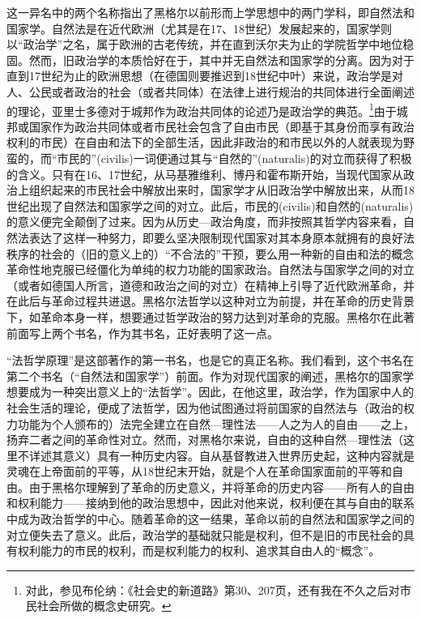 这一异名中的两个名称指出了黑格尔以前形而上学思想中的两门学科，即自然法和国家学。自然法是在近代欧洲（尤其是在17、18世纪）发展起来的，国家学则以“政治学”之名，属于欧洲的古老传统，并在直到沃尔夫为止的学院哲学中地位稳固。然而，旧政治学的本质恰好在于，其中并无自然法和国家学的分离。因为对于直到17世纪为止的欧洲思想（在德国则要推迟到18世纪中叶）来说，政治学是对人、公民或者政治的社会（或者共同体）在法律上进行规治的共同体进行全面阐述的理论，亚里士多德对于城邦作为政治共同体的论述乃是政治学的典范。\footnote{对此，参见布伦纳：《社会史的新道路》第30、207页，还有我在不久之后对市民社会所做的概念史研究。}由于城邦或国家作为政治共同体或者市民社会包含了自由市民（即基于其身份而享有政治权利的市民）在自由和法下的全部生活，因此非政治的和市民以外的人就表现为野蛮的，而“市民的”(civilis)一词便通过其与“自然的”(naturalis)的对立而获得了积极的含义。只有在16、17世纪，从马基雅维利、博丹和霍布斯开始，当现代国家从政治上组织起来的市民社会中解放出来时，国家学才从旧政治学中解放出来，从而18世纪出现了自然法和国家学之间的对立。此后，市民的(civilis)和自然的(naturalis)的意义便完全颠倒了过来。因为从历史—政治角度，而非按照其哲学内容来看，自然法表达了这样一种努力，即要么坚决限制现代国家对其本身原本就拥有的良好法秩序的社会的（旧的意义上的）“不合法的”干预，要么用一种新的自由和法的概念革命性地克服已经僵化为单纯的权力功能的国家政治。自然法与国家学之间的对立（或者如德国人所言，道德和政治之间的对立）在精神上引导了近代欧洲革命，并在此后与革命过程共进退。黑格尔法哲学以这种对立为前提，并在革命的历史背景下，如革命本身一样，想要通过哲学政治的努力达到对革命的克服。黑格尔在此著前面写上两个书名，作为其书名，正好表明了这一点。

“法哲学原理”是这部著作的第一书名，也是它的真正名称。我们看到，这个书名在第二个书名（“自然法和国家学”）前面。作为对现代国家的阐述，黑格尔的国家学想要成为一种突出意义上的“法哲学”。因此，在他这里，政治学，作为国家中人的社会生活的理论，便成了法哲学，因为他试图通过将前国家的自然法与（政治的权力功能为个人颁布的）法完全建立在自然—理性法——人之为人的自由——之上，扬弃二者之间的革命性对立。然而，对黑格尔来说，自由的这种自然—理性法（这里不详述其意义）具有一种历史内容。自从基督教进入世界历史起，这种内容就是灵魂在上帝面前的平等，从18世纪末开始，就是个人在革命国家面前的平等和自由。由于黑格尔理解到了革命的历史意义，并将革命的历史内容——所有人的自由和权利能力——接纳到他的政治思想中，因此对他来说，权利便在其与自由的联系中成为政治哲学的中心。随着革命的这一结果，革命以前的自然法和国家学之间的对立便失去了意义。此后，政治学的基础就只能是权利，但不是旧的市民社会的具有权利能力的市民的权利，而是权利能力的权利、追求其自由人的“概念”。

